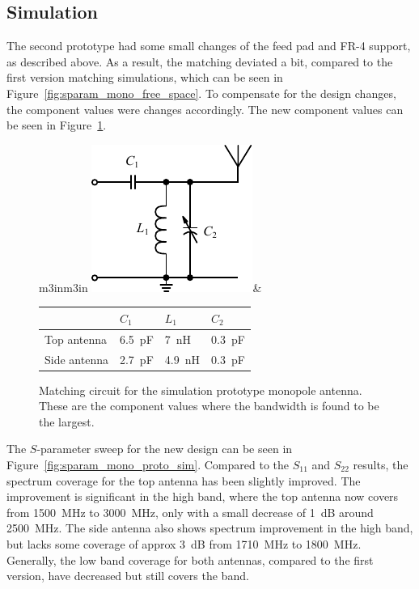 \FloatBarrier
\subsection{Simulation} %
The second prototype had some small changes of the feed pad and FR-4 support, as described above. As a result, the matching deviated a bit, compared to the first version matching simulations, which can be seen in Figure~\ref{fig:sparam_mono_free_space}. To compensate for the design changes, the component values were changes accordingly. The new component values can be seen in Figure~\ref{fig:mono_proto_sim_matching}.

\begin{figure}[htbp]
        \centering
        \begin{tabular}{m{3in}m{3in}}
            \centering
            \includegraphics{img/tech_sol/schematic_tuning_1}&
            \centering
            \footnotesize
            \begin{tabular}{|l|l|l|l|}
                \hline
                & $C_1$ & $L_1$ & $C_2$ \\
                \hline
                Top antenna & \SI{6.5}{pF} & \SI{7}{nH} & \SI{0.3}{pF} \\
                Side antenna & \SI{2.7}{pF} & \SI{4.9}{nH} & \SI{0.3}{pF} \\
                \hline
            \end{tabular}
        \end{tabular}
    \caption{Matching circuit for the simulation prototype monopole antenna. These are the component values where the bandwidth is found to be the largest.}
    \label{fig:mono_proto_sim_matching}
\end{figure}

The $S$-parameter sweep for the new design can be seen in Figure~\ref{fig:sparam_mono_proto_sim}. Compared to the $S_{11}$ and $S_{22}$ results, the spectrum coverage for the top antenna has been slightly improved. The improvement is significant in the high band, where the top antenna now covers from \SI{1500}{MHz} to \SI{3000}{MHz}, only with a small decrease of \SI{1}{dB} around \SI{2500}{MHz}. The side antenna also shows spectrum improvement in the high band, but lacks some coverage of approx \SI{3}{dB} from \SI{1710}{MHz} to \SI{1800}{MHz}. Generally, the low band coverage for both antennas, compared to the first version, have decreased but still covers the band.

